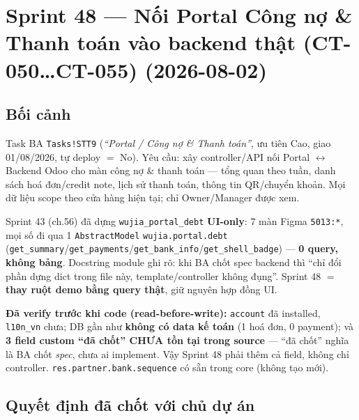 \chapter{Sprint 48 --- Nối Portal Công nợ \& Thanh toán vào backend thật (CT-050…CT-055) (2026-08-02)}

\section{Bối cảnh}

Task BA \texttt{Tasks!STT9} (\emph{``Portal / Công nợ \& Thanh toán''}, ưu tiên Cao, giao
01/08/2026, tự deploy $=$ No). Yêu cầu: xây controller/API nối Portal $\leftrightarrow$ Backend
Odoo cho màn công nợ \& thanh toán --- tổng quan theo tuần, danh sách hoá đơn/credit note,
lịch sử thanh toán, thông tin QR/chuyển khoản. Mọi dữ liệu scope theo cửa hàng hiện tại; chỉ
Owner/Manager được xem.

Sprint 43 (ch.56) đã dựng \texttt{wujia\_portal\_debt} \textbf{UI-only}: 7 màn Figma
\texttt{5013:*}, mọi số đi qua 1 \texttt{AbstractModel} \texttt{wujia.portal.debt}
(\texttt{get\_summary}/\texttt{get\_payments}/\texttt{get\_bank\_info}/\texttt{get\_shell\_badge})
--- \textbf{0 query, không bảng}. Docstring module ghi rõ: khi BA chốt spec backend thì
``chỉ đổi phần dựng dict trong file này, template/controller không đụng''. Sprint 48 $=$
\textbf{thay ruột demo bằng query thật}, giữ nguyên hợp đồng UI.

\textbf{Đã verify trước khi code (read-before-write):} \texttt{account} đã installed,
\texttt{l10n\_vn} chưa; DB gần như \textbf{không có data kế toán} (1 hoá đơn, 0 payment); và
\textbf{3 field custom ``đã chốt'' CHƯA tồn tại trong source} --- ``đã chốt'' nghĩa là BA chốt
\emph{spec}, chưa ai implement. Vậy Sprint 48 phải thêm cả field, không chỉ controller.
\texttt{res.partner.bank.sequence} có sẵn trong core (không tạo mới).

\section{Quyết định đã chốt với chủ dự án}

